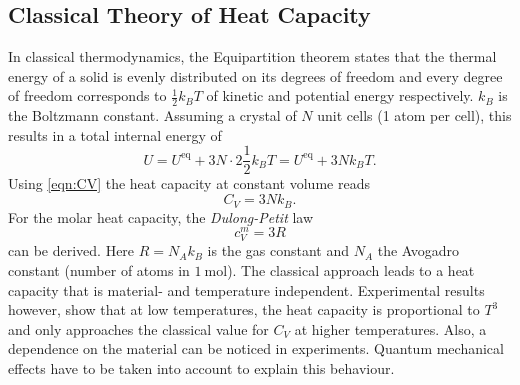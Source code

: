 \subsection{Classical Theory of Heat Capacity}
\label{subsec:Classical}

In classical thermodynamics, the Equipartition theorem states that the thermal energy of a solid is evenly distributed on its degrees of freedom and every degree of
freedom corresponds to $\frac{1}{2}k_B T$ of kinetic and potential energy respectively. $k_B$ is the Boltzmann constant.
Assuming a crystal of $N$ unit cells (1 atom per cell), this results in a total internal energy of
\begin{equation*}
    U = U^\text{eq} + 3N \cdot 2 \frac{1}{2}k_B T = U^\text{eq} + 3Nk_B T.
\end{equation*}
Using \autoref{eqn:CV} the heat capacity at constant volume reads
\begin{equation*}
    C_V = 3Nk_B.
\end{equation*}
For the molar heat capacity, the \textit{Dulong-Petit} law
\begin{equation}
    c^m_V = 3 R
\end{equation}
can be derived. Here $R = N_A k_B$ is the gas constant and $N_A$ the Avogadro constant (number of atoms in $\qty{1}{\mol}$).
The classical approach leads to a heat capacity that is material- and temperature independent. Experimental results however, show that at low temperatures, the heat capacity is
proportional to $T^3$ and only approaches the classical value for $C_V$ at higher temperatures. Also, a dependence on the material can be noticed in experiments.
Quantum mechanical effects have to be taken into account to explain this behaviour.

